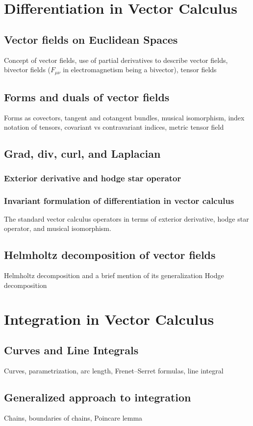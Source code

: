 \chapter{Differentiation in Vector Calculus}
\section{Vector fields on Euclidean Spaces}
Concept of vector fields, use of partial derivatives to describe vector fields, bivector fields ($F_{\mu\nu}$ in electromagnetism being a bivector), tensor fields
\section{Forms and duals of vector fields}
Forms as covectors, tangent and cotangent bundles, musical isomorphism, index notation of tensors, covariant vs contravariant indices, metric tensor field
\section{Grad, div, curl, and Laplacian}
\subsection{Exterior derivative and hodge star operator}
\subsection{Invariant formulation of differentiation in vector calculus}
The standard vector calculus operators in terms of exterior derivative, hodge star operator, and musical isomorphism.

\section{Helmholtz decomposition of vector fields}
Helmholtz decomposition and a brief mention of its generalization Hodge decomposition

\chapter{Integration in Vector Calculus}
\section{Curves and Line Integrals}
Curves, parametrization, arc length, Frenet–Serret formulas, line integral
\section{Generalized approach to integration}
Chains, boundaries of chains, Poincare lemma
